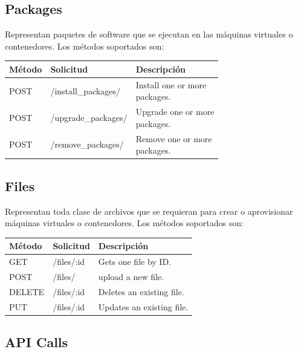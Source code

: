 \documentclass[conference, spanish]{IEEEtran}
\begin{document}
\subsection{Packages}
Representan paquetes de software que se ejecutan en las máquinas virtuales o contenedores. Los métodos soportados son:

\begin{center}
 \begin{tabular}{| l | l | l |}
 \hline
  \textbf{Método} & \textbf{Solicitud} & \textbf{Descripción} \\ [0.5ex] 
  \hline\hline
  POST & /install\_packages/ & \pbox{4cm}{Install one or more\\ packages.} \\ 
  \hline
  POST & /upgrade\_packages/ & \pbox{4cm}{Upgrade one or more\\ packages.} \\
  \hline
  POST & /remove\_packages/ & \pbox{4cm}{Remove one or more \\packages.} \\ [1ex] 
  \hline
\end{tabular}
\end{center}

\subsection{Files}
Representan toda clase de archivos que se requieran para crear o aprovisionar máquinas virtuales o contenedores. Los métodos soportados son:

\begin{center}
 \begin{tabular}{| l | l | l |}
 \hline
  \textbf{Método} & \textbf{Solicitud} & \textbf{Descripción} \\ [0.5ex] 
  \hline\hline
  GET & /files/:id & Gets one file by ID. \\
  \hline
  POST & /files/ & upload a new file. \\
  \hline
  DELETE & /files/:id & Deletes an existing file. \\
  \hline  
  PUT & /files/:id & Updates an existing file. \\ [1ex]  
  \hline
\end{tabular}
\end{center}


\subsection{API Calls}
\end{document}
